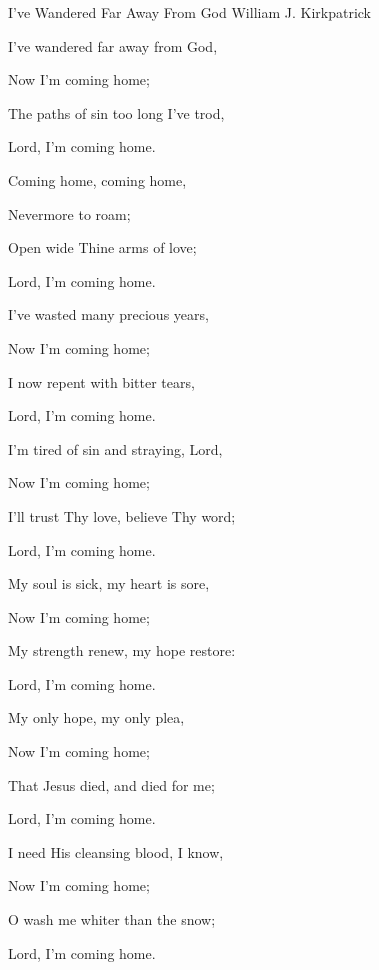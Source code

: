 \documentclass[12pt]{book}
\begin{document}
\WBPageBrk

\begin{song}{I've Wandered Far Away From God}{}
  {\SBPubDom}
  {William J. Kirkpatrick}
  {}
  {}

  \begin{SBVerse}
    I've wandered far away from God,

    Now I'm coming home;

    The paths of sin too long I've trod,

    Lord, I'm coming home.
  \end{SBVerse}

  \begin{SBOpGroup}
    Coming home, coming home,

    Nevermore to roam;

    Open wide Thine arms of love;

    Lord, I'm coming home.
  \end{SBOpGroup}

  \begin{SBVerse}
    I've wasted many precious years,

    Now I'm coming home;

    I now repent with bitter tears,

    Lord, I'm coming home.
  \end{SBVerse}

  \begin{SBVerse}
    I'm tired of sin and straying, Lord,

    Now I'm coming home;

    I'll trust Thy love, believe Thy word;

    Lord, I'm coming home.
  \end{SBVerse}

  \begin{SBVerse}
    My soul is sick, my heart is sore,

    Now I'm coming home;

    My strength renew, my hope restore:

    Lord, I'm coming home.
  \end{SBVerse}

  \begin{SBVerse}
    My only hope, my only plea,

    Now I'm coming home;

    That Jesus died, and died for me;

    Lord, I'm coming home.
  \end{SBVerse}

  \begin{SBVerse}
    I need His cleansing blood, I know,

    Now I'm coming home;

    O wash me whiter than the snow;

    Lord, I'm coming home.
  \end{SBVerse}
\end{song}
\end{document}
